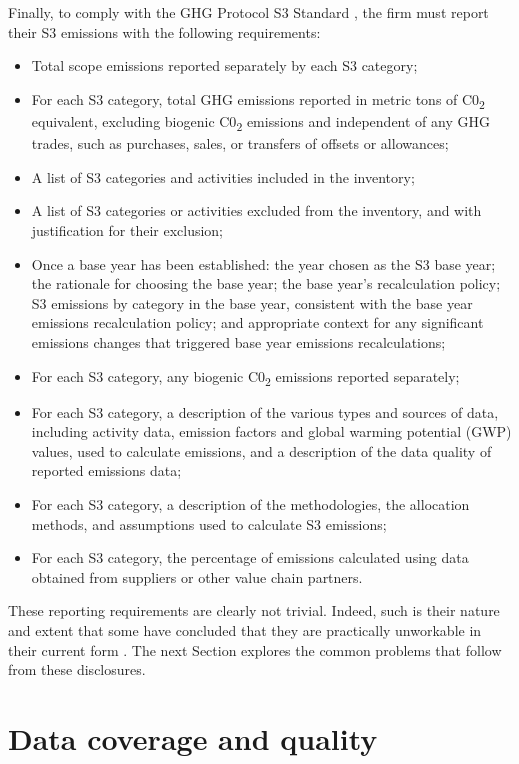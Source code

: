\documentclass[12pt,twoside]{report}
\begin{document}
\\ \\
Finally, to comply with the GHG Protocol S3 Standard \cite{ghgscope32013}, the firm must report their S3 emissions with the following requirements:
\begin{itemize}
	\item Total scope emissions reported separately by each S3 category;
	\item For each S3 category, total GHG emissions reported in metric tons of C0\textsubscript{2} equivalent, excluding biogenic C0\textsubscript{2} emissions and independent of any GHG trades, such as purchases, sales, or transfers of offsets or allowances;
	\item A list of S3 categories and activities included in the inventory;
	\item A list of S3 categories or activities excluded from the inventory, and with justification for their exclusion;
	\item Once a base year has been established: the year chosen as the S3 base year; the rationale for choosing the base year; the base year's recalculation policy; S3 emissions by category in the base year, consistent with the base year emissions recalculation policy; and appropriate context for any significant emissions changes that triggered base year emissions recalculations;
	\item For each S3 category, any biogenic C0\textsubscript{2} emissions reported separately; 
	\item For each S3 category, a description of the various types and sources of data, including activity data, emission factors and global warming potential (GWP) values, used to calculate emissions, and a description of the data quality of reported emissions data;
	\item For each S3 category, a description of the methodologies, the allocation methods, and assumptions used to calculate S3 emissions;
	\item For each S3 category, the percentage of emissions calculated using data obtained from suppliers or other value chain partners.
\end{itemize}
These reporting requirements are clearly not trivial. Indeed, such is their nature and extent that some have concluded that they are practically unworkable in their current form \cite{patchell2018}. The next Section explores the common problems that follow from these disclosures.

\section{Data coverage and quality}\label{sec:Scope3Challenges}
\end{document}
